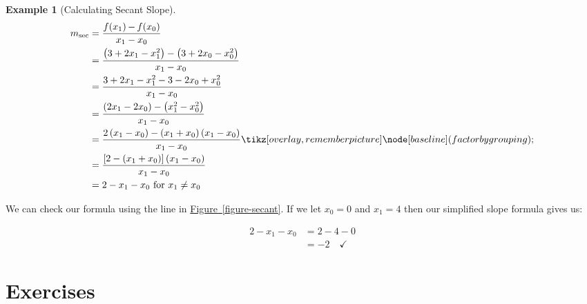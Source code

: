 \documentclass[12pt,]{book}
\theoremstyle{plain}
\theoremstyle{definition}
\newtheorem{example}[theorem]{Example}
\numberwithin{equation}{section}
\newcommand{\tikzmark}[1]{\tikz[overlay,remember picture] \node[baseline] (#1) {};}%
\newcommand{\fe}[2]{\mathop{{#1}{\left(#2\right)}}}
\begin{document}
\begin{example}[Calculating Secant Slope]\label{example-secant}
\begin{align*}
m_{\text{sec}}&=\frac{\fe{f}{x_1}-\fe{f}{x_0}}{x_1-x_0}\\
&=\frac{\left(3+2x_1-x_1^2\right)-\left(3+2x_0-x_0^2\right)}{x_1-x_0}\\
&=\frac{3+2x_1-x_1^2-3-2x_0+x_0^2}{x_1-x_0}\\
&=\frac{\left(2x_1-2x_0\right)-\left(x_1^2-x_0^2\right)}{x_1-x_0}\\
&=\frac{2\left(x_1-x_0\right)-\left(x_1+x_0\right)\left(x_1-x_0\right)}{x_1-x_0}\tikzmark{factor by grouping}\\
&=\frac{\left[2-\left(x_1+x_0\right)\right]\left(x_1-x_0\right)}{x_1-x_0}\\
&=2-x_1-x_0\text{ for }x_1\neq x_0
\end{align*}
\begin{multicols}{2}
\par
We can check our formula using the line in \hyperref[figure-secant]{Figure~\ref*{figure-secant}}. If we let \(x_0=0\) and \(x_1=4\) then our simplified slope formula gives us:
        \vfill
\columnbreak

        \begin{align*}
2-x_1-x_0&=2-4-0\\
&=-2\quad\checkmark
\end{align*}%
\end{multicols}%
\end{example}
\typeout{************************************************}
\typeout{************************************************}
\section*{Exercises}\label{exercises-2}
\end{document}
